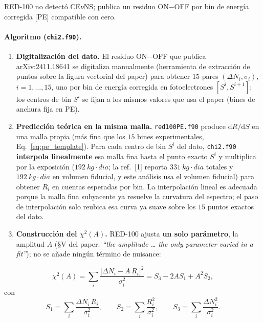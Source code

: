 \documentclass[11pt,a4paper]{article}
\newcommand{\code}[1]{\texttt{#1}}
\newcommand{\dd}{\mathrm{d}}
\begin{document}
RED-100 no detect\'o CE$\nu$NS; publica un residuo ON$-$OFF por bin de energ\'ia
corregida [PE] compatible con cero.

\paragraph{Algoritmo (\code{chi2.f90}).}
\begin{enumerate}\itemsep2pt
  \item \textbf{Digitalizaci\'on del dato.} El residuo ON$-$OFF que publica
    arXiv:2411.18641 se digitaliza manualmente (herramienta de extracci\'on de
    puntos sobre la figura vectorial del paper) para obtener $15$ pares
    $(\Delta N_{i},\sigma_{i})$, $i=1,\ldots,15$, uno por bin de energ\'ia
    corregida en fotoelectrones $[S^{i},S^{i+1}]$; los
    centros de bin $S^{i}$ se fijan a los mismos valores que usa el
    paper (bines de anchura fija en PE).
  \item \textbf{Predicci\'on te\'orica en la misma malla.} \code{red100PE.f90}
    produce $\dd R/\dd S$ en una malla propia (m\'as fina que los $15$ bines
    experimentales, Eq.~\eqref{eq:pe_template}). Para cada centro de bin
    $S^{i}$ del dato, \code{chi2.f90} \textbf{interpola linealmente}
    esa malla fina hasta el punto exacto $S^{i}$ y multiplica por la
    exposici\'on ($\SI{192}{kg\cdot dia}$; la ref.~[1] reporta
    $\SI{331}{kg\cdot dia}$ totales y $\SI{192}{kg\cdot dia}$ en volumen
    fiducial, y este an\'alisis usa el volumen fiducial) para obtener $R_{i}$
    en cuentas esperadas por bin. La interpolaci\'on lineal es adecuada porque la
    malla fina subyacente ya resuelve la curvatura del espectro; el paso de
    interpolaci\'on solo reubica esa curva ya suave sobre los $15$ puntos exactos
    del dato.
  \item \textbf{Construcci\'on del $\chi^{2}(A)$.} RED-100 ajusta \textbf{un solo
    par\'ametro}, la amplitud $A$ (\S V del paper: \emph{``the amplitude \ldots
    the only parameter varied in a fit''}); no se a\~nade ning\'un t\'ermino de
    nuisance:
\end{enumerate}
\begin{equation}
  \label{eq:chi2_nuis}
  \chi^{2}(A)
  = \sum_{i}
    \frac{\bigl[\Delta N_{i} - A\,R_{i}\bigr]^{2}}{\sigma_{i}^{2}}
  = S_{3} - 2AS_{1} + A^{2}S_{2},
\end{equation}
con
\begin{equation}
  \label{eq:S123}
  S_{1} = \sum_{i}\frac{\Delta N_{i}\,R_{i}}{\sigma_{i}^{2}},
  \qquad
  S_{2} = \sum_{i}\frac{R_{i}^{2}}{\sigma_{i}^{2}},
  \qquad
  S_{3} = \sum_{i}\frac{\Delta N_{i}^{2}}{\sigma_{i}^{2}}.
\end{equation}
\end{document}
